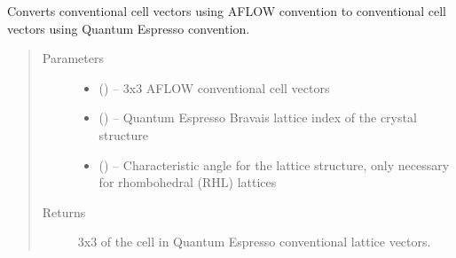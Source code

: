 \documentclass[letterpaper,10pt,english]{sphinxmanual}
\begin{document}
\begin{fulllineitems}
\label{\detokenize{retr:retr.conv_aflow2qe}}
Converts conventional cell vectors using AFLOW convention to conventional
cell vectors using Quantum Espresso convention.
\begin{quote}\begin{description}
\item[{Parameters}] \leavevmode\begin{itemize}
\item {} 
 () -- 3x3 AFLOW conventional cell vectors

\item {} 
 () -- Quantum Espresso Bravais lattice index of the crystal
structure

\item {} 
 () -- Characteristic angle for the lattice structure, only
necessary for rhombohedral (RHL) lattices

\end{itemize}

\item[{Returns}] \leavevmode
3x3  of the cell in Quantum Espresso conventional lattice
vectors.

\end{description}\end{quote}

\end{fulllineitems}

\end{document}
